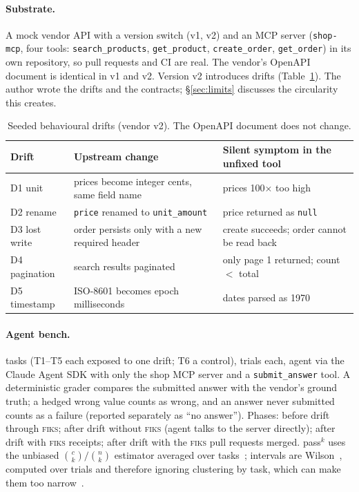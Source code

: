 \documentclass[10pt]{article}
\newcommand{\fiks}{\textsc{fiks}}
\begin{document}
\paragraph{Substrate.} A mock vendor API with a version switch (v1, v2) and an MCP server (\texttt{shop-mcp}, four tools: \texttt{search\_products}, \texttt{get\_product}, \texttt{create\_order}, \texttt{get\_order}) in its own repository, so pull requests and CI are real. The vendor's OpenAPI document is identical in v1 and v2. Version v2 introduces \nDrifts{} drifts (Table~\ref{tab:drifts}). The author wrote the drifts and the contracts; \S\ref{sec:limits} discusses the circularity this creates.

\begin{table}[t]
\centering\small
\caption{Seeded behavioural drifts (vendor v2). The OpenAPI document does not change.}
\label{tab:drifts}
\begin{tabular}{lll}
\toprule
Drift & Upstream change & Silent symptom in the unfixed tool \\
\midrule
D1 unit & prices become integer cents, same field name & prices 100$\times$ too high \\
D2 rename & \texttt{price} renamed to \texttt{unit\_amount} & price returned as \texttt{null} \\
D3 lost write & order persists only with a new required header & create succeeds; order cannot be read back \\
D4 pagination & search results paginated & only page 1 returned; count $<$ total \\
D5 timestamp & ISO-8601 becomes epoch milliseconds & dates parsed as 1970 \\
\bottomrule
\end{tabular}
\end{table}

\paragraph{Agent bench.} \nTasks{} tasks (T1--T5 each exposed to one drift; T6 a control), \kTrials{} trials each, agent \benchModel{} via the Claude Agent SDK with only the shop MCP server and a \texttt{submit\_answer} tool. A deterministic grader compares the submitted answer with the vendor's ground truth; a hedged wrong value counts as wrong, and an answer never submitted counts as a failure (reported separately as ``no answer''). Phases: before drift through \fiks; after drift without \fiks{} (agent talks to the server directly); after drift with \fiks{} receipts; after drift with the \nPrsMerged{} \fiks{} pull requests merged. pass$^k$ uses the unbiased $\binom{c}{k}/\binom{n}{k}$ estimator averaged over tasks~\cite{yao2024taubench,chen2021codex}; intervals are Wilson~\cite{brown2001binomial}, computed over trials and therefore ignoring clustering by task, which can make them too narrow~\cite{bowyer2025clt}.
\end{document}
